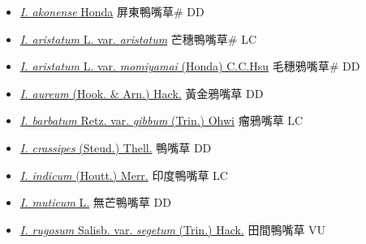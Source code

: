 \begin{itemize}
  \begin{itemize}
        \item[] \href{http://www.theplantlist.org/tpl1.1/search?q=Ischaemum+akonense}{\textit{I. akonense} Honda}   屏東鴨嘴草\# DD
        \item[] \href{http://www.theplantlist.org/tpl1.1/search?q=Ischaemum+aristatum+var.+aristatum}{\textit{I. aristatum} L. var. \textit{aristatum}}   芒穗鴨嘴草\# LC
        \item[] \href{http://www.theplantlist.org/tpl1.1/search?q=Ischaemum+aristatum+var.+momiyamai}{\textit{I. aristatum} L. var. \textit{momiyamai} (Honda) C.C.Hsu}   毛穗鴉嘴草\# DD
        \item[] \href{http://www.theplantlist.org/tpl1.1/search?q=Ischaemum+aureum}{\textit{I. aureum} (Hook. \& Arn.) Hack.}   黃金鴉嘴草 DD
        \item[] \href{http://www.theplantlist.org/tpl1.1/search?q=Ischaemum+barbatum+var.+gibbum}{\textit{I. barbatum} Retz. var. \textit{gibbum} (Trin.) Ohwi}   瘤鴉嘴草 LC
        \item[] \href{http://www.theplantlist.org/tpl1.1/search?q=Ischaemum+crassipes}{\textit{I. crassipes} (Steud.) Thell.}   鴨嘴草 DD
        \item[] \href{http://www.theplantlist.org/tpl1.1/search?q=Ischaemum+indicum}{\textit{I. indicum} (Houtt.) Merr.}   印度鴨嘴草 LC
        \item[] \href{http://www.theplantlist.org/tpl1.1/search?q=Ischaemum+muticum}{\textit{I. muticum} L.}   無芒鴨嘴草 DD
        \item[] \href{http://www.theplantlist.org/tpl1.1/search?q=Ischaemum+rugosum+var.+segetum}{\textit{I. rugosum} Salisb. var. \textit{segetum} (Trin.) Hack.}   田間鴨嘴草 VU

\end{itemize}
\end{itemize}
